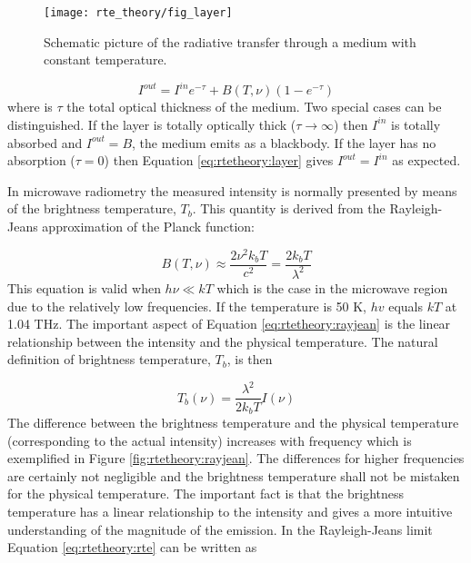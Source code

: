  \begin{figure}
  \begin{center}
   \begin{minipage}[c]{0.4\textwidth}
    \centering
    \caption{Schematic picture of the radiative transfer through a medium with
             constant temperature.}
    \label{fig:rtetheory:layer}
   \end{minipage}%
   \hspace{0.05\textwidth}%
   \begin{minipage}[c]{0.50\textwidth}
    \centering
    \texttt{[image: rte\_theory/fig\_layer]}
   \end{minipage}
  \end{center}
 \end{figure}   
  
 \begin{equation}
   I^{out} = I^{in}e^{-\tau} + B(T,\nu)(1-e^{-\tau})
  \label{eq:rtetheory:layer}
 \end{equation}  
 where is $\tau$ the total optical thickness of the medium. Two
 special cases can be distinguished. If the layer is totally optically
 thick ($\tau \to \infty$) then $I^{in}$ is totally absorbed and
 $I^{out} = B$, the medium emits as a blackbody. If the layer has no
 absorption ($\tau=0$) then Equation \ref{eq:rtetheory:layer} gives
 $I^{out} = I^{in}$ as expected.
 
 In microwave radiometry the measured intensity is normally presented
 by means of the brightness temperature, $T_b$. This quantity is
 derived from the Rayleigh-Jeans approximation of the Planck function:

 \begin{equation}
   B(T,\nu) \approx \frac{2\nu^2k_bT}{c^2} = \frac{2k_bT}{\lambda^2}
  \label{eq:rtetheory:rayjean}
 \end{equation}  
 This equation is valid when $h\nu \ll kT$ which is the case in the
 microwave region due to the relatively low frequencies. If the
 temperature is 50 K, $hv$ equals $kT$ at 1.04 THz. The important
 aspect of Equation \ref{eq:rtetheory:rayjean} is the linear relationship
 between the intensity and the physical temperature. The natural
 definition of brightness temperature, $T_b$, is then

 \begin{equation}
   T_b(\nu) = \frac{\lambda^2}{2k_bT} I(\nu)
  \label{eq:rtetheory:tb}
 \end{equation}  
 The difference between the brightness temperature and the physical
 temperature (corresponding to the actual intensity) increases with
 frequency which is exemplified in Figure \ref{fig:rtetheory:rayjean}. The
 differences for higher frequencies are certainly not negligible and
 the brightness temperature shall not be mistaken for the physical
 temperature. The important fact is that the brightness temperature
 has a linear relationship to the intensity and gives a more intuitive
 understanding of the magnitude of the emission. In the Rayleigh-Jeans
 limit Equation \ref{eq:rtetheory:rte} can be written as

